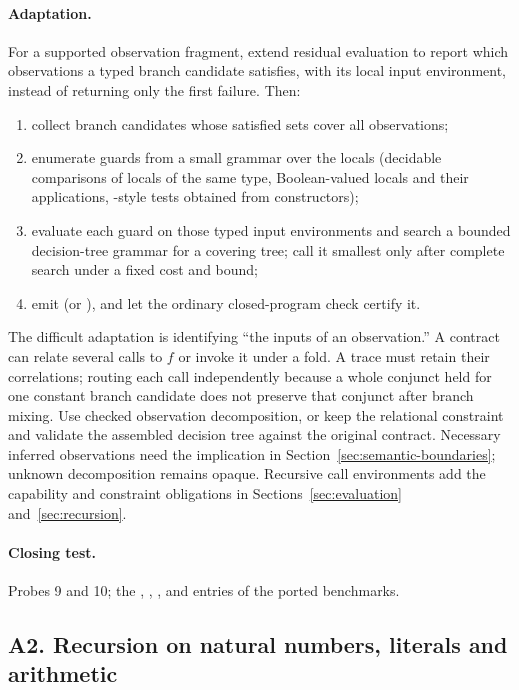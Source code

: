 \paragraph{Adaptation.} For a supported observation fragment, extend residual
evaluation to report which observations a typed branch candidate satisfies,
with its local input environment, instead of returning only the first failure.
Then:
\begin{enumerate}
\item collect branch candidates whose satisfied sets cover all observations;
\item enumerate guards from a small grammar over the locals (decidable comparisons of locals of the same type, Boolean-valued locals and their applications, -style tests obtained from constructors);
\item evaluate each guard on those typed input environments and search a bounded
decision-tree grammar for a covering tree; call it smallest only after complete
search under a fixed cost and bound;
\item emit  (or ), and let the ordinary closed-program check certify it.
\end{enumerate}
The difficult adaptation is identifying ``the inputs of an observation.'' A
contract can relate several calls to $f$ or invoke it under a fold. A trace
must retain their correlations; routing each call independently because a
whole conjunct held for one constant branch candidate does not preserve that
conjunct after branch mixing. Use checked observation decomposition, or keep
the relational constraint and validate the assembled decision tree against
the original contract. Necessary inferred observations need the implication
in Section~\ref{sec:semantic-boundaries}; unknown decomposition remains opaque.
Recursive call environments add the capability and constraint obligations in
Sections~\ref{sec:evaluation} and~\ref{sec:recursion}.

\paragraph{Closing test.} Probes 9 and 10; the , , ,  and  entries of the ported benchmarks.

\subsection{A2. Recursion on natural numbers, literals and arithmetic}

